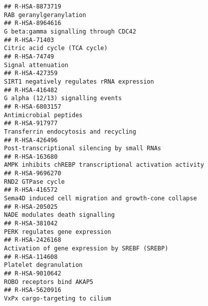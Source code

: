 \documentclass[
]{article}
\begin{document}
\begin{verbatim}
## R-HSA-8873719                                                                                                              RAB geranylgeranylation
## R-HSA-8964616                                                                                                G beta:gamma signalling through CDC42
## R-HSA-71403                                                                                                          Citric acid cycle (TCA cycle)
## R-HSA-74749                                                                                                                     Signal attenuation
## R-HSA-427359                                                                                            SIRT1 negatively regulates rRNA expression
## R-HSA-416482                                                                                                     G alpha (12/13) signalling events
## R-HSA-6803157                                                                                                               Antimicrobial peptides
## R-HSA-917977                                                                                                 Transferrin endocytosis and recycling
## R-HSA-426496                                                                                          Post-transcriptional silencing by small RNAs
## R-HSA-163680                                                                              AMPK inhibits chREBP transcriptional activation activity
## R-HSA-9696270                                                                                                                    RND2 GTPase cycle
## R-HSA-416572                                                                                Sema4D induced cell migration and growth-cone collapse
## R-HSA-205025                                                                                                       NADE modulates death signalling
## R-HSA-381042                                                                                                        PERK regulates gene expression
## R-HSA-2426168                                                                                       Activation of gene expression by SREBF (SREBP)
## R-HSA-114608                                                                                                               Platelet degranulation 
## R-HSA-9010642                                                                                                            ROBO receptors bind AKAP5
## R-HSA-5620916                                                                                                       VxPx cargo-targeting to cilium

\end{verbatim}
\end{document}
